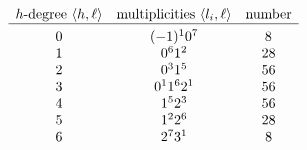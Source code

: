 \documentclass{math}
\theoremstyle{plain}
\newtheorem{remark}[theorem]{Remark}
\numberwithin{equation}{section}
\newcommand{\mystruth}[1]{\phantom{\hbox{\vrule height #1}}}
\newcommand{\intf}[1]{\langle #1 \rangle}
\newcommand{\bfP}{\mathbf{P}}
\newcommand{\bP}{\bm{P}}
\newcommand{\involB}{i_B}
\begin{document}
%
%
 \begin{table}
 \[
 \begin{array}{ccc}
 \textrm{$h$-degree $\intf{h, \ell}$}  & \textrm{multiplicities $\intf{l_i, \ell}$} & \textrm{number}\\
 \hline
 0 & (-1)^1 0^7 & 8 \mystruth{12pt}\\
1 & 0^6 1^2 & 28 \\
2 &  0^3 1^5 & 56 \\
3 & 0^1 1^6 2^1 & 56 \\
4 & 1^5 2^3 & 56 \\
5 & 1^2 2^6 & 28 \\
6 & 2^7 3^1& 8 
 \end{array}
 \]
 \caption{$240$ curves in \texorpdfstring{${\bfP}^{2}$}{P2}}\label{table:hdegandmults}
 \end{table}
%
\end{document}
